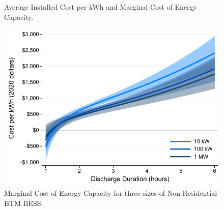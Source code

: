 \documentclass[preprint,12pt,authoryear]{elsarticle}
\begin{document}
\begin{figure}[p]
\centering
\caption{Average Installed Cost per kWh and Marginal Cost of Energy Capacity.}\label{fig:mc_ac}

\bigskip
\bigskip

\includegraphics[width=\textwidth]{graphs/CA_SGIP/non_residential_mc_by_size.pdf}
\caption{Marginal Cost of Energy Capacity for three sizes of Non-Residential BTM BESS.}\label{fig:non_residential_mc_by_size}
\end{figure}
\end{document}
